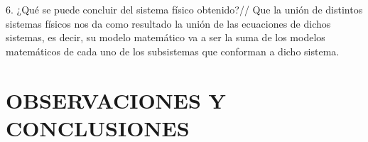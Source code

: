 6. ¿Qué se puede concluir del sistema físico obtenido?//
Que la unión de distintos sistemas físicos nos da como resultado la unión de las ecuaciones de dichos sistemas, es decir, su modelo matemático va a ser la suma de los modelos matemáticos de cada uno de los subsistemas que conforman a dicho sistema.

\section{OBSERVACIONES Y CONCLUSIONES}